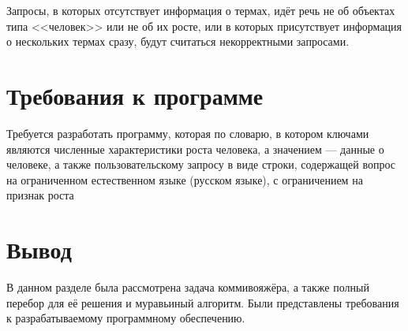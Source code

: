 Запросы, в которых отсутствует информация о термах, идёт речь не об объектах типа <<человек>> или не об их росте, или в которых присутствует информация о нескольких термах сразу, будут считаться некорректными запросами.


\section{Требования к программе}
Требуется разработать программу, которая по словарю, в котором ключами являются численные характеристики роста человека, а значением --- данные о человеке, а также пользовательскому запросу в виде строки, содержащей вопрос на ограниченном естественном языке (русском языке), с ограничением на признак роста 

\section*{Вывод}

В данном разделе была рассмотрена задача коммивояжёра, а также полный перебор для её решения и муравьиный алгоритм. Были представлены требования к разрабатываемому программному обеспечению.
